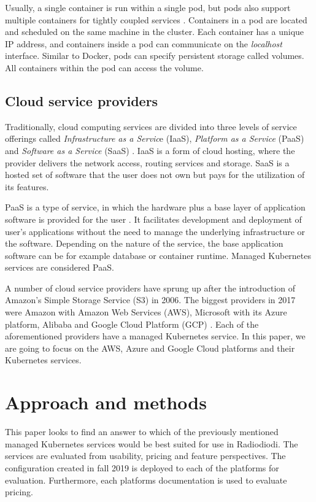 \documentclass[article]{aaltoseries}
\begin{document}
Usually, a single container is run within a single pod, but pods also support multiple containers for tightly coupled services \cite{k8s-pods}. Containers in a pod are located and scheduled on the same machine in the cluster. Each container has a unique IP address, and containers inside a pod can communicate on the \textit{localhost} interface. Similar to Docker, pods can specify persistent storage called volumes. All containers within the pod can access the volume.

\subsection{Cloud service providers}

Traditionally, cloud computing services are divided into three levels of service offerings called \textit{Infrastructure as a Servic}e (IaaS), \textit{Platform as a Service} (PaaS) and \textit{Software as a Service} (SaaS) \cite{bhardwaj2010cloud}. IaaS is a form of cloud hosting, where the provider delivers the network access, routing services and storage. SaaS is a hosted set of software that the user does not own but pays for the utilization of its features.

PaaS is a type of service, in which the hardware plus a base layer of application software is provided for the user \cite{bhardwaj2010cloud}. It facilitates development and deployment of user's applications without the need to manage the underlying infrastructure or the software. Depending on the nature of the service, the base application software can be for example database or container runtime. Managed Kubernetes services are considered PaaS.

A number of cloud service providers have sprung up after the introduction of Amazon's Simple Storage Service (S3) in 2006. The biggest providers in 2017 were Amazon with Amazon Web Services (AWS), Microsoft with its Azure platform, Alibaba and Google Cloud Platform (GCP) \cite{gartner}. Each of the aforementioned providers have a managed Kubernetes service. In this paper, we are going to focus on the AWS, Azure and Google Cloud platforms and their Kubernetes services.


\newpage
\section{Approach and methods}
\label{Criterias}
This paper looks to find an answer to which of the previously mentioned managed Kubernetes services would be best suited for use in Radiodiodi. The services are evaluated from usability, pricing and feature perspectives. The configuration created in fall 2019 is deployed to each of the platforms for evaluation. Furthermore, each platforms documentation is used to evaluate pricing.
\end{document}
